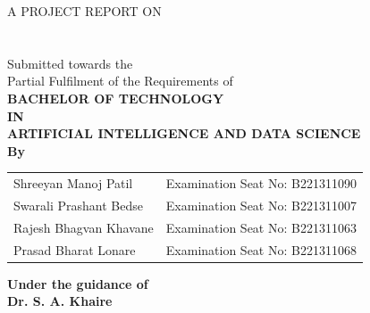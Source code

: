\documentclass[12pt,a4]{report}
\begin{document}
\pagestyle{empty}

\vspace*{\fill}
\begin{center}

{\large  A  PROJECT REPORT ON}\\
\vspace{0.5cm}
\vspace{0.5cm}
{\bfseries \fontsize{16}{12} \selectfont{MolVista AI}  \\ \vspace*{1\baselineskip}}
{\bfseries \fontsize{14}{12} \selectfont{Deep Learning Based Platform for Molecular Docking and Binding Affinity Prediction}  \\ \vspace*{2\baselineskip}}
{\fontsize{12}{12} \selectfont Submitted towards the
 \\Partial Fulfilment of the Requirements of} \\
\vspace{1cm}
{\bfseries \fontsize{14}{12} \selectfont BACHELOR OF TECHNOLOGY \\
\vspace*{0.5\baselineskip}
IN
\vspace*{0.5\baselineskip}
\\ARTIFICIAL INTELLIGENCE AND DATA SCIENCE\\
\vspace*{1\baselineskip}} 
\fontsize{14}{12} \selectfont \textbf{By} \\
{\large \begin{center}
\begin{tabular}{l l}
Shreeyan Manoj Patil        & Examination Seat No: B221311090  \\
Swarali Prashant Bedse        & Examination Seat No: B221311007  \\
Rajesh Bhagvan Khavane            & Examination Seat No: B221311063 \\
Prasad Bharat Lonare        & Examination Seat No: B221311068  \\

\end{tabular}
\end{center}}
{\bfseries \large Under the guidance of} \\
\vspace{0.5cm}
{\bfseries \large Dr. S. A. Khaire} \\ \vspace{0.5cm}


\end{center}
\end{document}
